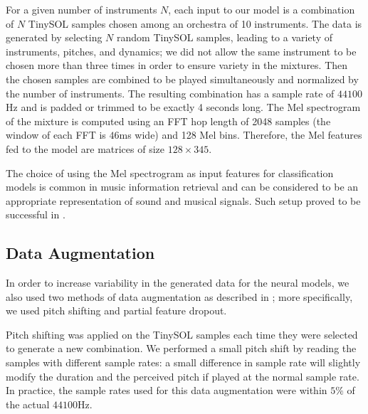 \documentclass[runningheads,a4paper]{llncs}
\begin{document}

For a given number of instruments $N$, each input to our model is a combination of $N$ TinySOL samples chosen among an orchestra of 10 instruments. The data is generated by selecting $N$ random TinySOL samples, leading to a variety of instruments, pitches, and dynamics; we did not allow the same instrument to be chosen more than three times in order to ensure variety in the mixtures. Then the chosen samples are combined to be played simultaneously and normalized by the number of instruments. The resulting combination has a sample rate of $44100$Hz and is padded or trimmed to be exactly 4 seconds long. The Mel spectrogram of the mixture is computed using an FFT hop length of 2048 samples (the window of each FFT is $46$ms wide) and 128 Mel bins. Therefore, the Mel features fed to the model are matrices of size $128\times 345$.

The choice of using the Mel spectrogram as input features for classification models is common in music information retrieval \cite{McKinney2003} and can be considered to be an appropriate representation of sound and musical signals. %
Such setup proved to be successful in \cite{Salamon17}.


\subsection{Data Augmentation}

In order to increase variability in the generated data for the neural models, we also used two methods of data augmentation as described in \cite{Salamon17, Bhardwaj17}; more specifically, we used pitch shifting and partial feature dropout.

Pitch shifting was applied on the TinySOL samples each time they were selected to generate a new combination. We performed a small pitch shift by reading the samples with different sample rates: a small difference in sample rate will slightly modify the duration and the perceived pitch if played at the normal sample rate. In practice, the sample rates used for this data augmentation were within $5\%$ of the actual $44100$Hz.
\end{document}
